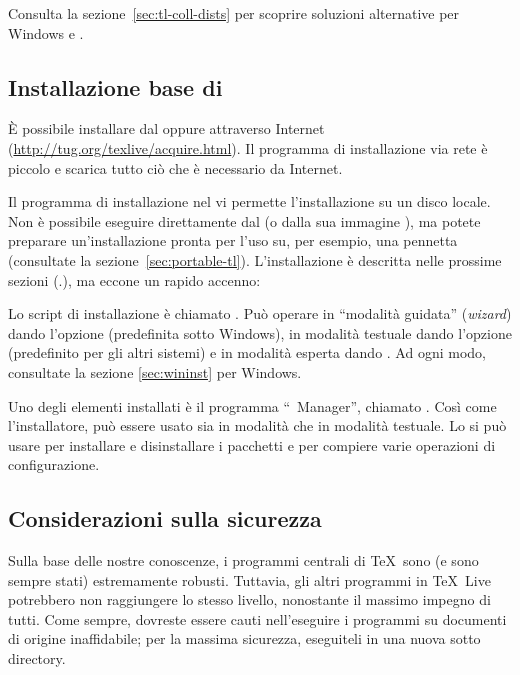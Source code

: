 \documentclass{article}
\begin{document}
Consulta la sezione~\ref{sec:tl-coll-dists} per scoprire soluzioni
alternative per Windows e \MacOSX.

\subsection{Installazione base di \protect\TL{}}
\label{sec:basic}

È possibile installare \TL{} dal \DVD{} oppure attraverso Internet
(\url{http://tug.org/texlive/acquire.html}). Il programma di installazione
via rete è piccolo e scarica tutto ciò che è necessario da Internet.

Il programma di installazione nel \DVD{} vi permette l'installazione su un
disco locale. Non è possibile eseguire \TL{} direttamente dal \DVD{} \TK{}
(o dalla sua immagine ), ma potete preparare un'installazione
pronta per l'uso su, per esempio, una pennetta \USB{} (consultate la
sezione~\ref{sec:portable-tl}). L'installazione è descritta nelle prossime
sezioni (\p.\pageref{sec:install}), ma eccone un rapido accenno:

\begin{itemize*}

\item Lo script di installazione è chiamato .
  Può operare in ``modalità guidata'' (\emph{wizard}) dando l'opzione
   (predefinita sotto Windows), in modalità testuale
  dando l'opzione  (predefinito per gli altri sistemi) e
  in modalità \GUI{} esperta dando . Ad ogni modo,
  consultate la sezione \ref{sec:wininst} per Windows.

\item Uno degli elementi installati è il programma ``\TL\ Manager'',
  chiamato . Così come l'installatore, può essere usato sia in
  modalità \GUI{} che in modalità testuale. Lo si può usare per installare
  e disinstallare i pacchetti e per compiere varie operazioni di
  configurazione.

\end{itemize*}


\subsection{Considerazioni sulla sicurezza}
\label{sec:security}

Sulla base delle nostre conoscenze, i programmi centrali di \TeX\ sono (e
sono sempre stati) estremamente robusti. Tuttavia, gli altri programmi in
\TeX\ Live potrebbero non raggiungere lo stesso livello, nonostante il
massimo impegno di tutti. Come sempre, dovreste essere cauti
nell'eseguire i programmi su documenti di origine inaffidabile; per la
massima sicurezza, eseguiteli in una nuova sotto directory.
\end{document}
